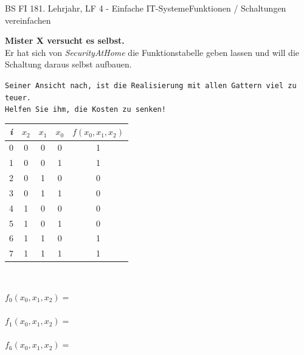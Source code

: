 \documentclass[oneside,openany,headings=optiontotoc,11pt,numbers=noenddot]{scrreprt}
\begin{document}
	\begin{worksheet}{BS FI 18}{1. Lehrjahr, LF 4 - Einfache IT-Systeme}{Funktionen / Schaltungen vereinfachen}
		\begin{framed}
			\noindent
			\begin{minipage}{0.58\textwidth}
				\textbf{Mister X versucht es selbst.}\\
				Er hat sich von \textit{SecurityAtHome} die Funktionstabelle geben lassen und will die Schaltung daraus selbst aufbauen.
				\par
				\begin{addmargin}[0.75cm]{0cm}
					\texttt{Seiner Ansicht nach, ist die Realisierung mit allen Gattern viel zu teuer.\\
						Helfen Sie ihm, die Kosten zu senken!}\\
				\end{addmargin}
			\end{minipage}
			\hfill
			\begin{minipage}{0.4\textwidth}
				\begin{tabular}{|c||ccc||c|}
					\hline
					\textit{i} & \(x_2\) & \(x_1\) & \(x_0\) & \(f(x_0,x_1,x_2)\)\\
					\hline
					0 & 0 & 0 & 0 & 1\\
					\hline
					1 & 0 & 0 & 1 & 1\\
					\hline
					2 & 0 & 1 & 0 & 0\\
					\hline
					3 & 0 & 1 & 1 & 0\\
					\hline
					4 & 1 & 0 & 0 & 0\\
					\hline
					5 & 1 & 0 & 1 & 0\\
					\hline
					6 & 1 & 1 & 0 & 1\\
					\hline
					7 & 1 & 1 & 1 & 1\\
					\hline
				\end{tabular}
			\end{minipage}
		\end{framed}
		\begin{framed}
			\noindent
			\tiny{\textit{\color{codegray}{Minterme}}}\\
			\par\noindent\normalsize
			\(f_0(x_0,x_1,x_2) = \)\\
			\\
			\(f_1(x_0,x_1,x_2) = \)\\
			\\
			\(f_6(x_0,x_1,x_2) = \)\\
			\\

\end{framed}
\end{worksheet}
\end{document}
